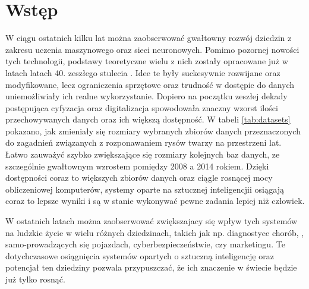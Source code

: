 \documentclass[a4paper,twoside,12pt]{book}
\newcounter{stronyPozaNumeracja}
\begin{document}
\vfill

 

\cleardoublepage


\pagestyle{tylkoNumeryStron}
\tableofcontents

\mainmatter
{}
\setcounter{stronyPozaNumeracja}{\value{page}}
\pagestyle{NumeryStronNazwyRozdzialow}


\chapter{Wstęp}
{W ciągu ostatnich kilku lat można zaobserwować gwałtowny rozwój dziedzin z zakresu uczenia maszynowego oraz sieci neuronowych. Pomimo pozornej nowości tych technologii, podstawy teoretyczne wielu z nich zostały opracowane już w latach latach 40. zeszłego stulecia \cite{bib:neural1}. Idee te były suckesywnie rozwijane oraz modyfikowane, lecz ograniczenia sprzętowe oraz trudność w dostępie do danych uniemożliwiały ich realne wykorzystanie. Dopiero na początku zeszłej dekady postępująca cyfyzacja oraz digitalizacja spowodowała znaczny wzorst ilości przechowywanych danych oraz ich większą dostępność. W tabeli \ref{tab:datasets} pokazano, jak zmieniały się rozmiary wybranych zbiorów danych przeznaczonych do  zagadnień związanych z rozponawaniem rysów twarzy na przestrzeni lat. Łatwo zauważyć szybko zwiększające się rozmiary kolejnych baz danych, ze szczególnie gwałtownym wzrostem pomiędzy 2008 a 2014 rokiem. Dzięki dostępności coraz to większych zbiorów danych oraz ciągle rosnącej mocy obliczeniowej komputerów, systemy oparte na sztucznej inteligencjii osiągają coraz to lepsze wyniki i są w stanie wykonywać pewne zadania lepiej niż człowiek.}

{ W ostatnich latach można zaobserwować zwiększajacy się wpływ tych systemów na ludzkie życie w wielu różnych dziedzinach, takich jak np. diagnostyce chorób\cite{bib:cancer}, \cite{bib:cancer2}, samo-prowadzących się pojazdach, cyberbezpieczeństwie, czy marketingu. Te dotychczasowe osiągnięcia systemów opartych o sztuczną inteligencję oraz potencjał ten dziedziny pozwala przypuszczać, że ich znaczenie w świecie będzie już tylko rosnąć.}
 
\end{document}
